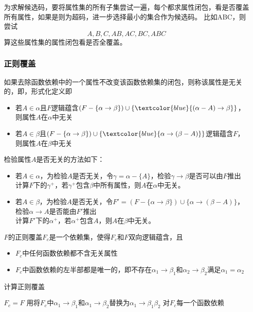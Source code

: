 \begin{example}
为求解候选码，要将属性集的所有子集尝试一遍，每个都求属性闭包，看是否覆盖所有属性，如果是则为超码，进一步选择最小的集合作为候选码。
比如ABC，则尝试
\[A,B,C,AB,AC,BC,ABC\]
算这些属性集的属性闭包看是否全覆盖。
\end{example}

\subsubsection{正则覆盖}
\begin{definition}[无关(extraneous)]
如果去除函数依赖中的一个属性不改变该函数依赖集的闭包，则称该属性是无关的，即，形式化定义即
\begin{itemize}
	\item 若$A\in\alpha$且$F$逻辑蕴含$(F-\{\alpha\to\beta\})\cup\{\textcolor{blue}{(\alpha-A)\to\beta}\}$，则属性$A$在$\alpha$中无关
	\item 若$A\in\beta$且$(F-\{\alpha\to\beta\})\cup\{\textcolor{blue}{\alpha\to(\beta-A)}\}$逻辑蕴含$F$，则属性$A$在$\beta$中无关
\end{itemize}
\end{definition}

检验属性$A$是否无关的方法如下：
\begin{itemize}
	\item 若$A\in\alpha$，为检验$A$是否无关，令$\gamma=\alpha-\{A\}$，检验$\gamma\to\beta$是否可以由$F$推出\\
	计算$F$下的$\gamma^+$，若$\gamma^+$包含$\beta$中所有属性，则$A$在$\alpha$中无关。
	\item 若$A\in\beta$，为检验$A$是否无关，令$F'=(F-\{\alpha\to\beta\})\cup\{\alpha\to(\beta-A)\}$，检验$\alpha\to A$是否能由$F'$推出\\
	计算$F'$下的$\alpha^+$，若$\alpha^+$包含$A$，则$A$在$\beta$中无关。
\end{itemize}

\begin{definition}
$F$的正则覆盖$F_c$是一个依赖集，使得$F_c$和$F$双向逻辑蕴含，且
\begin{itemize}
	\item $F_c$中任何函数依赖都不含无关属性
	\item $F_c$中函数依赖的左半部都是唯一的，即不存在$\alpha_1\to\beta_1$和$\alpha_2\to\beta_2$满足$\alpha_1=\alpha_2$
\end{itemize}
\end{definition}
\begin{algorithm}
\caption{计算正则覆盖}
\begin{algorithmic}[1]
\State $F_c=F$
\Repeat
\State 用将$F_c$中$\alpha_1\to\beta_1$和$\alpha_1\to\beta_2$替换为$\alpha_1\to\beta_1\beta_2$
\State 对$F_c$每一个函数依赖
\end{algorithmic}
\end{algorithm}

